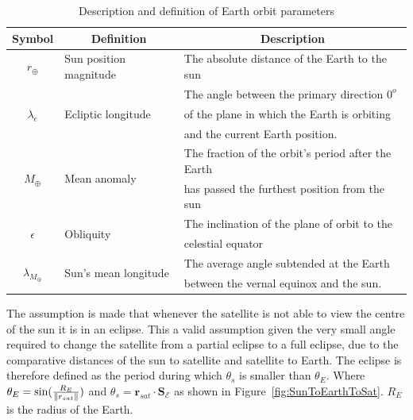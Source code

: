 \begin{table}[]
\caption{Description and definition of Earth orbit parameters}
\begin{tabular}{@{}cll@{}}
	\toprule
	\multicolumn{1}{c}{\textbf{Symbol}} &
	\multicolumn{1}{c}{\textbf{Definition}} &
	\multicolumn{1}{c}{\textbf{Description}} \\ \midrule
	\multicolumn{1}{|c|}{$r_{\oplus}$} &
	\multicolumn{1}{l|}{Sun position magnitude} &
	\multicolumn{1}{l|}{The absolute distance of the Earth to the sun} \\ \midrule
	\multicolumn{1}{|c|}{\multirow{3}{*}{$\lambda_e$}} &
	\multicolumn{1}{l|}{\multirow{3}{*}{Ecliptic longitude}} &
	\multicolumn{1}{l|}{The angle between the primary direction $0^o$} \\
	\multicolumn{1}{|c|}{} &
	\multicolumn{1}{l|}{} &
	\multicolumn{1}{l|}{of the plane in which the Earth is orbiting} \\
	\multicolumn{1}{|c|}{} &
	\multicolumn{1}{l|}{} &
	\multicolumn{1}{l|}{and the current Earth position.} \\ \midrule
	\multicolumn{1}{|c|}{\multirow{2}{*}{$M_{\oplus}$}} &
	\multicolumn{1}{l|}{\multirow{2}{*}{Mean anomaly}} &
	\multicolumn{1}{l|}{The fraction of the orbit's period after the Earth} \\
	\multicolumn{1}{|c|}{} &
	\multicolumn{1}{l|}{} &
	\multicolumn{1}{l|}{has passed the furthest position from the sun} \\ \midrule
	\multicolumn{1}{|c|}{\multirow{2}{*}{$\epsilon$}} &
	\multicolumn{1}{l|}{\multirow{2}{*}{Obliquity}} &
	\multicolumn{1}{l|}{The inclination of the plane of orbit to the} \\
	\multicolumn{1}{|c|}{} &
	\multicolumn{1}{l|}{} &
	\multicolumn{1}{l|}{celestial equator} \\ \midrule
	\multicolumn{1}{|c|}{\multirow{2}{*}{$\lambda_{M_{\oplus}}$}} &
	\multicolumn{1}{l|}{\multirow{2}{*}{Sun's mean longitude}} &
	\multicolumn{1}{l|}{The average angle subtended at the Earth} \\
	\multicolumn{1}{|c|}{} &
	\multicolumn{1}{l|}{} &
	\multicolumn{1}{l|}{between the vernal equinox and the sun. \cite{ross1916sun}} \\ \bottomrule
\end{tabular}
\label{table:SunOrbitParameters}
\end{table}

The assumption is made that whenever the satellite is not able to view the centre of the sun it is in an eclipse. This a valid assumption given the very small angle required to change the satellite from a partial eclipse to a full eclipse, due to the comparative distances of the sun to satellite and satellite to Earth. The eclipse is therefore defined as the period during which $\theta_{s}$ is smaller than $\theta_E$. Where $\theta_E = \text{sin}(\frac{R_E}{\left\lVert r_{sat}\right\rVert})$ and $\theta_{s} = \mathbf{r}_{sat} \cdot \mathbf{S}_{\mathcal{E}}$ as shown in Figure~\ref{fig:SunToEarthToSat}. $R_E$ is the radius of the Earth.

